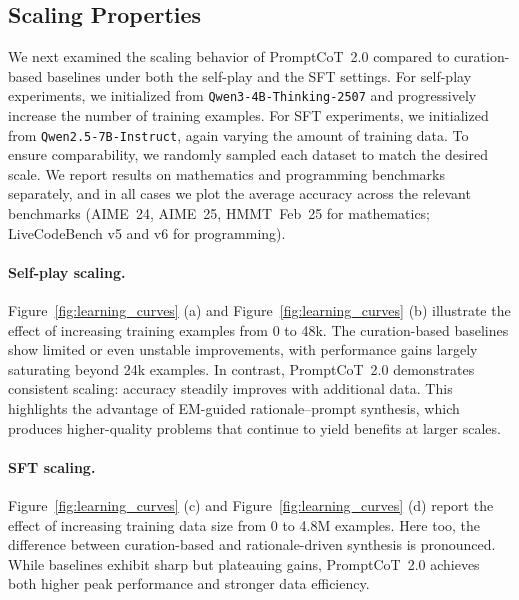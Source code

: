 \subsection{Scaling Properties}
\label{sec:scaling}

We next examined the scaling behavior of PromptCoT~2.0 compared to curation-based baselines under both the self-play and the SFT settings.  
For self-play experiments, we initialized from \texttt{Qwen3-4B-Thinking-2507} and progressively increase the number of training examples.  
For SFT experiments, we initialized from \texttt{Qwen2.5-7B-Instruct}, again varying the amount of training data.  
To ensure comparability, we randomly sampled each dataset to match the desired scale.  
We report results on mathematics and programming benchmarks separately, and in all cases we plot the average accuracy across the relevant benchmarks (AIME~24, AIME~25, HMMT~Feb~25 for mathematics; LiveCodeBench v5 and v6 for programming).  

\paragraph{Self-play scaling.}  
Figure~\ref{fig:learning_curves} (a) and Figure~\ref{fig:learning_curves} (b) illustrate the effect of increasing training examples from 0 to 48k.  
The curation-based baselines show limited or even unstable improvements, with performance gains largely saturating beyond 24k examples.  
In contrast, PromptCoT~2.0 demonstrates consistent scaling: accuracy steadily improves with additional data.  
This highlights the advantage of EM-guided rationale–prompt synthesis, which produces higher-quality problems that continue to yield benefits at larger scales.  

\paragraph{SFT scaling.}  
Figure~\ref{fig:learning_curves} (c) and Figure~\ref{fig:learning_curves} (d) report the effect of increasing training data size from 0 to 4.8M examples.  
Here too, the difference between curation-based and rationale-driven synthesis is pronounced.  
While baselines exhibit sharp but plateauing gains, PromptCoT~2.0 achieves both higher peak performance and stronger data efficiency.  




